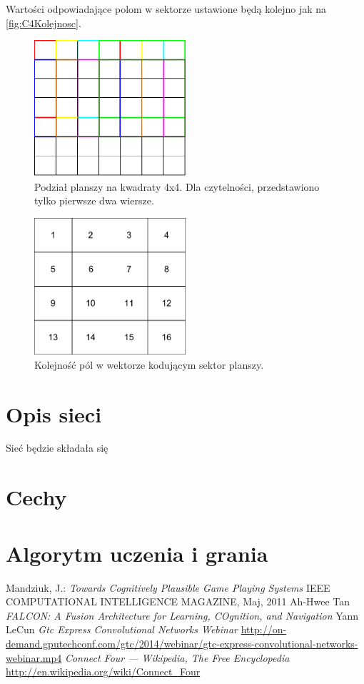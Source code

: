 \documentclass{llncs}
\begin{document}
Wartości odpowiadające polom w sektorze ustawione będą kolejno jak na \autoref{fig:C4Kolejnosc}. 

\begin{figure}
	\centering	
	\includegraphics[width=0.5\textwidth]{img/ConnectFour4x4.pdf}
	\caption{Podział planszy na kwadraty 4x4. Dla czytelności, przedstawiono tylko pierwsze dwa wiersze.}
	\label{fig:C4Podzial}
\end{figure}

\begin{figure}
	\centering	
	\includegraphics[width=0.5\textwidth]{img/ConnectFourOrder.pdf}	\caption{Kolejność pól w wektorze kodującym sektor planszy.}
	\label{fig:C4Kolejnosc}
\end{figure}

\section{Opis sieci}
Sieć będzie składała się 

\section{Cechy}
\section{Algorytm uczenia i grania}


%
%
\begin{thebibliography}{4}
%
Mandziuk, J.:
\textsl{Towards Cognitively Plausible Game Playing Systems}
IEEE COMPUTATIONAL INTELLIGENCE MAGAZINE, Maj, 2011
Ah-Hwee Tan
\textsl{FALCON: A Fusion Architecture for Learning, COgnition, and Navigation}
Yann LeCun
\textsl{Gtc Express Convolutional Networks Webinar}
\url{http://on-demand.gputechconf.com/gtc/2014/webinar/gtc-express-convolutional-networks-webinar.mp4}
\textsl{Connect Four --- {W}ikipedia{,} The Free Encyclopedia}
\url{http://en.wikipedia.org/wiki/Connect_Four}
\end{thebibliography}
\end{document}
